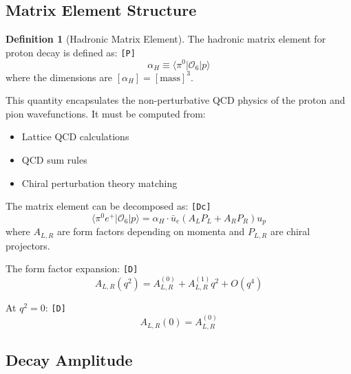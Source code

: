 \documentclass[11pt,a4paper]{article}
\newcommand{\tagD}{\textcolor{green!50!black}{\texttt{[D]}}}
\newcommand{\tagDc}{\textcolor{blue!70!black}{\texttt{[Dc]}}}
\newcommand{\tagP}{\textcolor{orange!80!black}{\texttt{[P]}}}
\theoremstyle{definition}
\newtheorem{definition}{Definition}[section]
\begin{document}
\subsection{Matrix Element Structure}
\label{subsec:matrix-element}

\begin{definition}[Hadronic Matrix Element]
\label{def:hadronic-me}
The hadronic matrix element for proton decay is defined as: \tagP{}
\begin{equation}
\label{eq:alpha-h-definition}
\boxed{\alpha_H \equiv \langle \pi^0 | \mathcal{O}_6 | p \rangle}
\end{equation}
where the dimensions are $[\alpha_H] = [\text{mass}]^3$.
\end{definition}

This quantity encapsulates the non-perturbative QCD physics of the proton
and pion wavefunctions. It must be computed from:
\begin{itemize}
  \item Lattice QCD calculations
  \item QCD sum rules
  \item Chiral perturbation theory matching
\end{itemize}

\begin{derivbox}
The matrix element can be decomposed as: \tagDc{}
\begin{equation}
\label{eq:me-decomposition}
\langle \pi^0 e^+ | \mathcal{O}_6 | p \rangle =
\alpha_H \cdot \bar{u}_e (A_L P_L + A_R P_R) u_p
\end{equation}
where $A_{L,R}$ are form factors depending on momenta and $P_{L,R}$ are
chiral projectors.
\end{derivbox}

The form factor expansion: \tagD{}
\begin{equation}
\label{eq:form-factor-expansion}
A_{L,R}(q^2) = A_{L,R}^{(0)} + A_{L,R}^{(1)} q^2 + O(q^4)
\end{equation}

At $q^2 = 0$: \tagD{}
\begin{equation}
\label{eq:form-factor-zero}
A_{L,R}(0) = A_{L,R}^{(0)}
\end{equation}

\subsection{Decay Amplitude}
\label{subsec:decay-amplitude}
\end{document}
